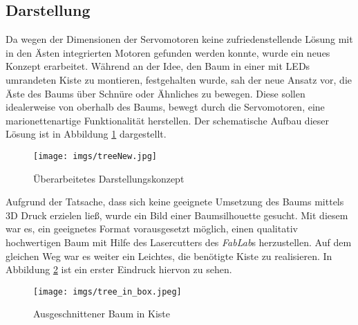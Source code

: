 \documentclass[.../Dokumentation.tex]{subfiles}
\begin{document}
\subsection{Darstellung}\label{sec-ita3-visualization}
Da wegen der Dimensionen der Servomotoren keine zufriedenstellende Lösung 
mit in den Ästen integrierten Motoren gefunden werden konnte, wurde ein neues 
Konzept erarbeitet.
Während an der Idee, den Baum in einer mit LEDs umrandeten Kiste zu montieren, 
festgehalten wurde, sah der neue Ansatz vor, die Äste des Baums über Schnüre 
oder Ähnliches zu bewegen.
Diese sollen idealerweise von oberhalb des Baums, bewegt durch die Servomotoren, 
eine marionettenartige Funktionalität herstellen.
Der schematische Aufbau dieser Lösung ist in Abbildung \ref{fig-treeNew} 
dargestellt.
\begin{figure}[H]
\begin{center}
    \texttt{[image: imgs/treeNew.jpg]}
    \caption{Überarbeitetes Darstellungskonzept}
    \label{fig-treeNew}
\end{center}
\end{figure}
\noindent
Aufgrund der Tatsache, dass sich keine geeignete Umsetzung des Baums  
mittels 3D Druck erzielen ließ, wurde ein Bild einer Baumsilhouette gesucht.
Mit diesem war es, ein geeignetes Format vorausgesetzt möglich, einen qualitativ 
hochwertigen Baum mit Hilfe des Lasercutters des \textit{FabLab}s herzustellen.
Auf dem gleichen Weg war es weiter ein Leichtes, die benötigte Kiste zu 
realisieren.
In Abbildung \ref{fig-tree-in-box} ist ein erster Eindruck hiervon zu sehen.
\begin{figure}[H]
\begin{center}
    \texttt{[image: imgs/tree\_in\_box.jpeg]}
    \caption{Ausgeschnittener Baum in Kiste}
    \label{fig-tree-in-box}
\end{center}
\end{figure}
\end{document}
